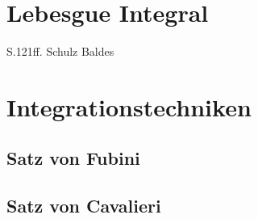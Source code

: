 \section{Lebesgue Integral}
\label{\detokenize{masstheorie/lebesgue_integral:lebesgue-integral}}\label{\detokenize{masstheorie/lebesgue_integral::doc}}
\par
S.121ff. Schulz Baldes


\section{Integrationstechniken}
\label{\detokenize{masstheorie/integrationstechnik:integrationstechniken}}\label{\detokenize{masstheorie/integrationstechnik::doc}}

\subsection{Satz von Fubini}
\label{\detokenize{masstheorie/integrationstechnik:satz-von-fubini}}

\subsection{Satz von Cavalieri}
\label{\detokenize{masstheorie/integrationstechnik:satz-von-cavalieri}}

